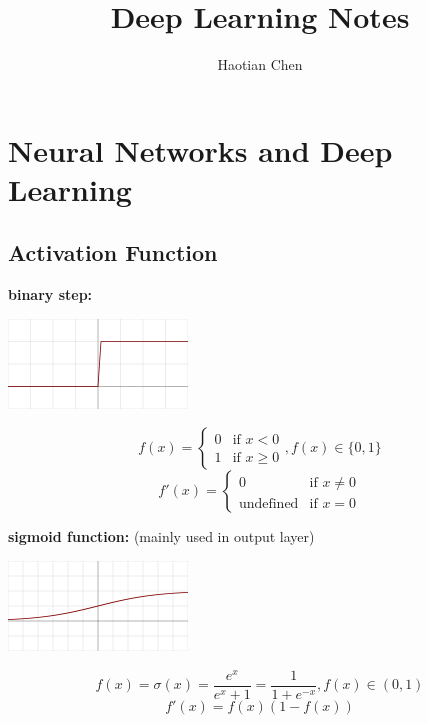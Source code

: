 \documentclass{article}
\title{Deep Learning Notes}
\author{Haotian Chen}
\date{}
\begin{document}
\maketitle

\clearpage

\tableofcontents{}

\clearpage

\section{Neural Networks and Deep Learning}

\subsection{Activation Function}

\noindent \textbf{binary step:}

\begin{center}
\includegraphics[scale=0.8]{./images/binary_step.png}
\end{center}

\[f(x) = \begin{cases}0&{\text{if }}x<0\\1&{\text{if }}x\geq 0\end{cases}, f(x) \in \{0, 1\}\]
\[f'(x) = \begin{cases}0&{\text{if }}x\neq 0\\{\text{undefined}}&{\text{if }}x=0\end{cases}\]

\noindent \textbf{sigmoid function:} (mainly used in output layer)

\begin{center}
\includegraphics[scale=0.8]{./images/sigmoid.png}
\end{center}

\[f(x) = \sigma (x)={\frac {e^{x}}{e^{x}+1}}={\frac {1}{1+e^{-x}}}, f(x) \in (0, 1)\]
\[f'(x) = f(x)(1-f(x))\]
\end{document}
